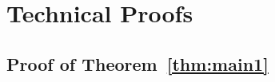 \documentclass[11pt]{article}
\newtheorem{lemma}[theorem]{Lemma}
\begin{document}
\section{Technical Proofs}\label{sec:proofs}


\subsection{Proof of Theorem~\ref{thm:main1}}


\end{document}
